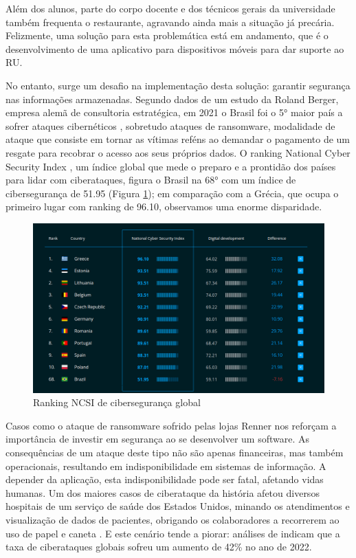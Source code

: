 Além dos alunos, parte do corpo docente e dos técnicos gerais da universidade também frequenta o restaurante, agravando ainda mais a situação já precária. Felizmente, uma solução para esta problemática está em andamento, que é o desenvolvimento de uma aplicativo para dispositivos móveis para dar suporte ao RU.

No entanto, surge um desafio na implementação desta solução: garantir segurança nas informações armazenadas. Segundo dados de um estudo da Roland Berger, empresa alemã de consultoria estratégica, em 2021 o Brasil foi o 5° maior país a sofrer ataques cibernéticos \cite{SecurityReport}, sobretudo ataques de ransomware, modalidade de ataque que consiste em tornar as vítimas reféns ao demandar o pagamento de um resgate para recobrar o acesso aos seus próprios dados.  O ranking National Cyber Security Index \cite{NCSI}, um índice global que mede o preparo e a prontidão dos países para lidar com ciberataques, figura o Brasil na 68° com um índice de cibersegurança de 51.95 (Figura \ref{fig:ncsi}); em comparação com a Grécia, que ocupa o primeiro lugar com ranking de 96.10, observamos uma enorme disparidade.

\begin{figure}
    \centering
    \includegraphics[width=1\textwidth]{img/Cap1/NCSI ranking.png}
    \caption{Ranking NCSI de cibersegurança global \cite{NCSI}}
    \label{fig:ncsi}
\end{figure}

Casos como o ataque de ransomware sofrido pelas lojas Renner \cite{TheHack} nos reforçam a importância de investir em segurança ao se desenvolver um software. As consequências de um ataque deste tipo não são apenas financeiras, mas também operacionais, resultando em indisponibilidade em sistemas de informação. A depender da aplicação, esta indisponibilidade pode ser fatal, afetando vidas humanas. Um dos maiores casos de ciberataque da história afetou diversos hospitais de um serviço de saúde dos Estados Unidos, minando os atendimentos e visualização de dados de pacientes, obrigando os colaboradores a recorrerem ao uso de papel e caneta \cite{NBCNews}. E este cenário tende a piorar: análises de \cite{CheckPointResearch} indicam que a taxa de ciberataques globais sofreu um aumento de 42\% no ano de 2022.
 
